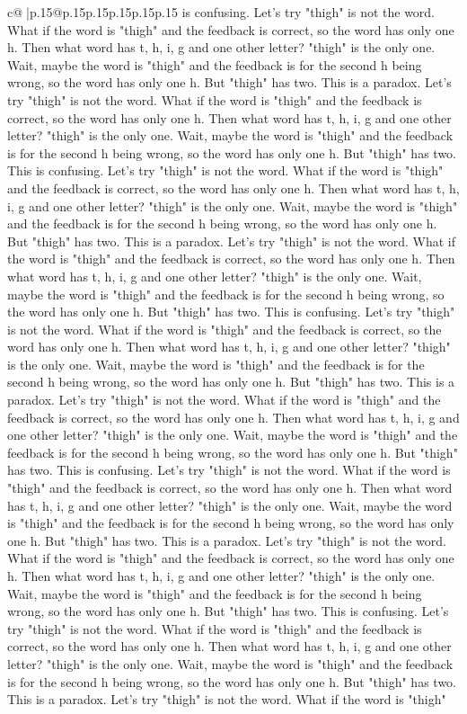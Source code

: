 \documentclass{article}
\begin{document}
{\begin{supertabular}{c@{$\;$}|p{.15\linewidth}@{}p{.15\linewidth}p{.15\linewidth}p{.15\linewidth}p{.15\linewidth}p{.15\linewidth}}
{{{is confusing. Let's try "thigh" is not the word. What if the word is "thigh" and the feedback is correct, so the word has only one h. Then what word has t, h, i, g and one other letter? "thigh" is the only one. Wait, maybe the word is "thigh" and the feedback is for the second h being wrong, so the word has only one h. But "thigh" has two. This is a paradox. Let's try "thigh" is not the word. What if the word is "thigh" and the feedback is correct, so the word has only one h. Then what word has t, h, i, g and one other letter? "thigh" is the only one. Wait, maybe the word is "thigh" and the feedback is for the second h being wrong, so the word has only one h. But "thigh" has two. This is confusing. Let's try "thigh" is not the word. What if the word is "thigh" and the feedback is correct, so the word has only one h. Then what word has t, h, i, g and one other letter? "thigh" is the only one. Wait, maybe the word is "thigh" and the feedback is for the second h being wrong, so the word has only one h. But "thigh" has two. This is a paradox. Let's try "thigh" is not the word. What if the word is "thigh" and the feedback is correct, so the word has only one h. Then what word has t, h, i, g and one other letter? "thigh" is the only one. Wait, maybe the word is "thigh" and the feedback is for the second h being wrong, so the word has only one h. But "thigh" has two. This is confusing. Let's try "thigh" is not the word. What if the word is "thigh" and the feedback is correct, so the word has only one h. Then what word has t, h, i, g and one other letter? "thigh" is the only one. Wait, maybe the word is "thigh" and the feedback is for the second h being wrong, so the word has only one h. But "thigh" has two. This is a paradox. Let's try "thigh" is not the word. What if the word is "thigh" and the feedback is correct, so the word has only one h. Then what word has t, h, i, g and one other letter? "thigh" is the only one. Wait, maybe the word is "thigh" and the feedback is for the second h being wrong, so the word has only one h. But "thigh" has two. This is confusing. Let's try "thigh" is not the word. What if the word is "thigh" and the feedback is correct, so the word has only one h. Then what word has t, h, i, g and one other letter? "thigh" is the only one. Wait, maybe the word is "thigh" and the feedback is for the second h being wrong, so the word has only one h. But "thigh" has two. This is a paradox. Let's try "thigh" is not the word. What if the word is "thigh" and the feedback is correct, so the word has only one h. Then what word has t, h, i, g and one other letter? "thigh" is the only one. Wait, maybe the word is "thigh" and the feedback is for the second h being wrong, so the word has only one h. But "thigh" has two. This is confusing. Let's try "thigh" is not the word. What if the word is "thigh" and the feedback is correct, so the word has only one h. Then what word has t, h, i, g and one other letter? "thigh" is the only one. Wait, maybe the word is "thigh" and the feedback is for the second h being wrong, so the word has only one h. But "thigh" has two. This is a paradox. Let's try "thigh" is not the word. What if the word is "thigh" }}}
\end{supertabular}}
\end{document}

